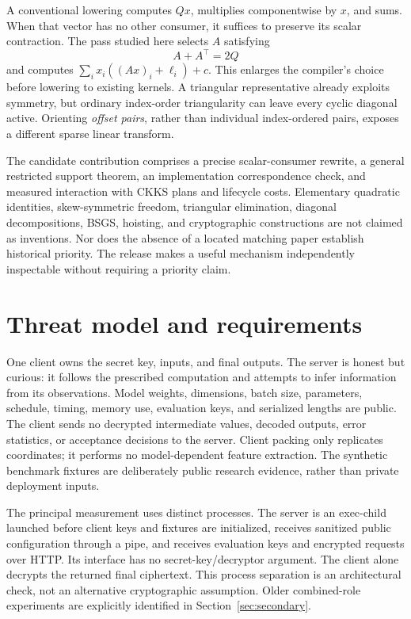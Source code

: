 \documentclass[10pt]{article}
\begin{document}
A conventional lowering computes $Qx$, multiplies componentwise by $x$, and sums. When that vector has no other consumer, it suffices to preserve its scalar contraction. The pass studied here selects $A$ satisfying
\begin{equation}\label{eq:admissible}
A+A^\top=2Q
\end{equation}
and computes $\sum_i x_i((Ax)_i+\ell_i)+c$. This enlarges the compiler's choice before lowering to existing kernels. A triangular representative already exploits symmetry, but ordinary index-order triangularity can leave every cyclic diagonal active. Orienting \emph{offset pairs}, rather than individual index-ordered pairs, exposes a different sparse linear transform.

The candidate contribution comprises a precise scalar-consumer rewrite, a general restricted support theorem, an implementation correspondence check, and measured interaction with CKKS plans and lifecycle costs. Elementary quadratic identities, skew-symmetric freedom, triangular elimination, diagonal decompositions, BSGS, hoisting, and cryptographic constructions are not claimed as inventions. Nor does the absence of a located matching paper establish historical priority. The release makes a useful mechanism independently inspectable without requiring a priority claim.

\section{Threat model and requirements}\label{sec:threat}
One client owns the secret key, inputs, and final outputs. The server is honest but curious: it follows the prescribed computation and attempts to infer information from its observations. Model weights, dimensions, batch size, parameters, schedule, timing, memory use, evaluation keys, and serialized lengths are public. The client sends no decrypted intermediate values, decoded outputs, error statistics, or acceptance decisions to the server. Client packing only replicates coordinates; it performs no model-dependent feature extraction. The synthetic benchmark fixtures are deliberately public research evidence, rather than private deployment inputs.

The principal measurement uses distinct processes. The server is an exec-child launched before client keys and fixtures are initialized, receives sanitized public configuration through a pipe, and receives evaluation keys and encrypted requests over HTTP. Its interface has no secret-key/decryptor argument. The client alone decrypts the returned final ciphertext. This process separation is an architectural check, not an alternative cryptographic assumption. Older combined-role experiments are explicitly identified in Section~\ref{sec:secondary}.
\end{document}
